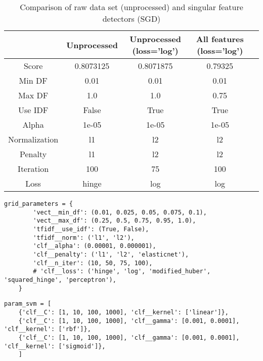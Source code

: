 \begin{table}[tbp]
	\centering
	\begin{tabular}{| c| c | c | c | c |}
		\hline
		~				& Unprocessed		& Unprocessed (loss='log')		& All features (loss='log')	\\ \hline
		Score 			& 0.8073125				& 0.8071875					& 0.79325					\\ \hline
		Min DF 			& 0.01					& 0.01						& 0.01						\\ \hline
		Max DF 			& 1.0					& 1.0						& 0.75						\\ \hline
		Use IDF			& False					& True						& True						\\ \hline
		Alpha 			& 1e-05					& 1e-05						& 1e-05						\\ \hline
		Normalization 	& l1					& l2						& l2						\\ \hline		
		Penalty 		& l1					& l2						& l2						\\ \hline
		Iteration 		& 100					& 75						& 100						\\ \hline
		Loss 			& hinge					& log						& log						\\ \hline		
	\end{tabular}
	\caption{Comparison of raw data set (unprocessed) and singular feature detectors (SGD)}
	\label{tab:unprocessed_vs_all_feature_detectors_sgd_so}
\end{table}


\begin{lstlisting}[caption={Parameters for SGD}, label={lst:param_sgd}] 
    grid_parameters = {
    	'vect__min_df': (0.01, 0.025, 0.05, 0.075, 0.1),
    	'vect__max_df': (0.25, 0.5, 0.75, 0.95, 1.0),
    	'tfidf__use_idf': (True, False),
    	'tfidf__norm': ('l1', 'l2'),
    	'clf__alpha': (0.00001, 0.000001),
    	'clf__penalty': ('l1', 'l2', 'elasticnet'),
    	'clf__n_iter': (10, 50, 75, 100),
    	# 'clf__loss': ('hinge', 'log', 'modified_huber', 'squared_hinge', 'perceptron'),
    }
\end{lstlisting}


\begin{lstlisting}[caption={Parameters for SVC}, label={lst:param_svc}] 
    param_svm = [
    {'clf__C': [1, 10, 100, 1000], 'clf__kernel': ['linear']},
    {'clf__C': [1, 10, 100, 1000], 'clf__gamma': [0.001, 0.0001], 'clf__kernel': ['rbf']},
    {'clf__C': [1, 10, 100, 1000], 'clf__gamma': [0.001, 0.0001], 'clf__kernel': ['sigmoid']},
    ]
\end{lstlisting}

